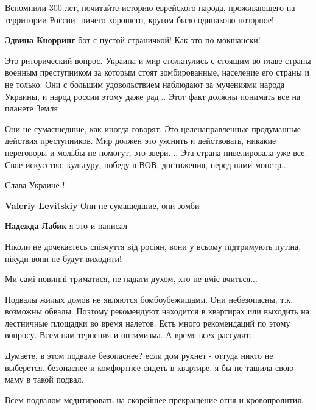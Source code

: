 \begin{itemize}
\begin{itemize}
Вспомнили 300 лет, почитайте историю еврейского народа, проживающего на
территории России- ничего хорошего, кругом было одинаково позорное!

\textbf{Эдвина Кнорринг} бот с пустой страничкой! Как это по-мокшански!

\end{itemize} %


Это риторический вопрос. Украина и мир столкнулись с стоящим во главе страны
военным преступником за которым стоят зомбированные, население его страны и не
только. Они с большим удовольствием наблюдают за мучениями народа Украины, и
народ россии этому даже рад... Этот факт должны понимать все на планете Земля

Они не сумасшедшие, как иногда говорят. Это целенаправленные продуманные
действия преступников. Мир должен это уяснить и действовать, никакие переговоры
и мольбы не помогут, это звери.... Эта страна нивелировала уже все. Свое
искусство, культуру, победу в ВОВ, достижения, перед нами монстр...

Слава Украине !

\begin{itemize} %
\textbf{Valeriy Levitskiy} Они не сумашедшие, они-зомби

\textbf{Надежда Лабик} я это и написал
\end{itemize} %


Ніколи не дочекаєтесь співчуття від росіян, вони у всьому підтримують
путіна, нікуди вони не будут виходити!

Ми самі повинні триматися, не падати духом, хто не вміє вчиться...


Подвалы жилых домов не являются бомбоубежищами. Они небезопасны, т.к. возможны
обвалы. Поэтому рекомендуют находится в квартирах или выходить на лестничные
площадки во время налетов. Есть много рекомендаций по этому вопросу. Всем нам
терпения и оптимизма. А время всех рассудит.


Думаете, в этом подвале безопаснее? если дом рухнет - оттуда никто не
выберется. безопаснее и комфортнее сидеть в квартире. я бы не тащила свою маму в
такой подвал.

Всем подвалом медитировать на скорейшее прекращение огня и кровопролития.


\end{itemize}

